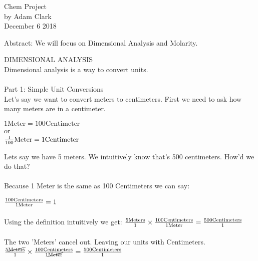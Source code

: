 \documentclass[14pt]{extarticle}
\begin{document}
    \center
    \LARGE Chem Project \\ 
    \normalsize
    by Adam Clark\\
    December 6 2018
    \vspace{\fill}
    
    \flushleft
    Abstract: We will focus on Dimensional Analysis and Molarity.
    \pagebreak
    
    \flushleft
    \large DIMENSIONAL ANALYSIS \\
    \normalsize
    Dimensional analysis is a way to convert units. 
    \\~~~\\
    Part 1: Simple Unit Conversions\\
    Let's say we want to convert meters to centimeters. First we need to ask how many meters are in a centimeter. 
    
    \center
    $ 1 \text{Meter} = 100 \text{Centimeter} $
    \\ or \\
    $ {1 \over 100} \text{Meter} = 1 \text{Centimeter} $
    \flushleft
    
    Lets say we have 5 meters. We intuitively know that's 500 centimeters. How'd we do that?
    \\~~~\\
    Because 1 Meter is the same as 100 Centimeters we can say:

    \center \large
    ${100 \text{Centimeters} \over 1 \text {Meter}} = 1$
    \\~\\
    \flushleft \normalsize
    Using the definition intuitively we get:
    \center \large
    ${5 \text{Meters} \over 1} \times {100 \text{Centimeters} \over 1 \text {Meter}} = {500 \text{Centimeters} \over 1}$
    \\~\\
    \flushleft \normalsize
    The two 'Meters' cancel out. Leaving our units with Centimeters. 
    \center \large
    ${5 \cancel{\text{Meters}} \over 1} \times {100 \text{Centimeters} \over 1 \cancel{\text {Meter}}} = {500 \text{Centimeters} \over 1}$
    
    
    
    
    
\end{document}
